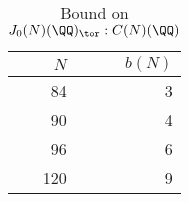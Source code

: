 \begin{table}%
    \label{tab:rank_zero_bound}
    \centering
    \caption{Bound on $J_0(N)(\QQ)_\tor:C(N)(\QQ)$}
    \begin{tabular}{rr}
        \toprule
        $N$ & $b(N)$ \\
        \midrule
        84 & 3 \\
        90 & 4 \\
        96 & 6 \\
        120 & 9
        \bottomrule
    \end{tabular}
\end{table}
